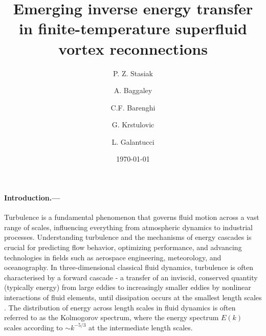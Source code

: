 \documentclass[%
 reprint,
 amsmath,amssymb,
 aps,
 prl,
]{revtex4-2}
\begin{document}

\title{Emerging inverse energy transfer in finite-temperature superfluid vortex reconnections}

\author{P. Z. Stasiak}
\author{A. Baggaley}
\author{C.F. Barenghi}

\author{G. Krstulovic}

\author{L. Galantucci}

\date{\today}%

\begin{abstract}
\blindtext
\end{abstract}

\maketitle

\paragraph*{Introduction.---}

Turbulence is a fundamental phenomenon that governs fluid motion across a vast range of scales, influencing everything from atmospheric dynamics to industrial processes. Understanding turbulence and the mechanisms of energy cascades is crucial for predicting flow behavior, optimizing performance, and advancing technologies in fields such as aerospace engineering, meteorology, and oceanography. In three-dimensional classical fluid dynamics, turbulence is often characterised by a forward cascade - a transfer of an inviscid, conserved quantity (typically energy) from large eddies to increasingly smaller eddies by nonlinear interactions of fluid elements, until dissipation occurs at the smallest length scales \cite{richardson1922weather}. The distribution of energy across length scales in fluid dynamics is often referred to as the Kolmogorov spectrum, where the energy spectrum $E(k)$ scales according to $\sim k^{-5/3}$ at the intermediate length scales. 
\end{document}
